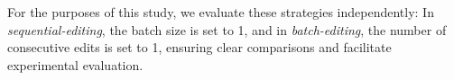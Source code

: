 For the purposes of this study, we evaluate these strategies independently: In \textit{sequential-editing}, the batch size is set to 1, and in \textit{batch-editing}, the number of consecutive edits is set to 1, ensuring clear comparisons and facilitate experimental evaluation.


